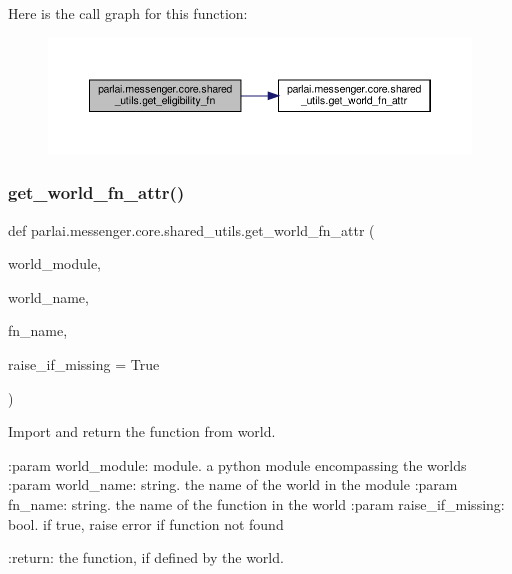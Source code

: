 Here is the call graph for this function\+:
\nopagebreak
\begin{figure}[H]
\begin{center}
\leavevmode
\includegraphics[width=350pt]{namespaceparlai_1_1messenger_1_1core_1_1shared__utils_a4eab6934f22c919b9a02da591739c192_cgraph}
\end{center}
\end{figure}
\mbox{\label{namespaceparlai_1_1messenger_1_1core_1_1shared__utils_a0a712961ea39c275ec4003871d0ff950}} 
\subsubsection{\texorpdfstring{get\+\_\+world\+\_\+fn\+\_\+attr()}{get\_world\_fn\_attr()}}
{\footnotesize\ttfamily def parlai.\+messenger.\+core.\+shared\+\_\+utils.\+get\+\_\+world\+\_\+fn\+\_\+attr (\begin{DoxyParamCaption}\item[{}]{world\+\_\+module,  }\item[{}]{world\+\_\+name,  }\item[{}]{fn\+\_\+name,  }\item[{}]{raise\+\_\+if\+\_\+missing = {\ttfamily True} }\end{DoxyParamCaption})}

\begin{DoxyVerb}Import and return the function from world.


:param world_module:
    module. a python module encompassing the worlds
:param world_name:
    string. the name of the world in the module
:param fn_name:
    string. the name of the function in the world
:param raise_if_missing:
    bool. if true, raise error if function not found

:return:
    the function, if defined by the world.
\end{DoxyVerb}
 

